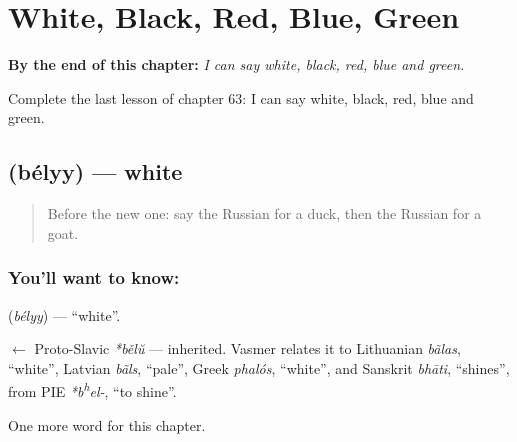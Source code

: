 
\chapter{White, Black, Red, Blue, Green}
\label{ch:ru-white-black-red-blue-green}

\begin{chapteropening}
\textbf{By the end of this chapter:} \emph{I can say white, black, red, blue and green.}

Complete the last lesson of chapter 63: I can say white, black, red, blue and green.
\end{chapteropening}

\section[\texorpdfstring{\ru{белый} (bélyy)}{белый (bélyy)}]{ (bélyy) — white}

\label{lesson:RU-C63-white}



\begin{quote}
Before the new one: say the Russian for a duck, then the Russian for a goat.
\end{quote}

\subsection*{You'll want to know: }
\textbf{} (\emph{bélyy}) — \textquotedblleft{}white\textquotedblright{}.

\begin{cousinweb}
\textbf{} $\leftarrow$ Proto-Slavic \emph{*bělŭ} — inherited. Vasmer relates it to Lithuanian \emph{bãlas}, \textquotedblleft{}white\textquotedblright{}, Latvian \emph{bãls}, \textquotedblleft{}pale\textquotedblright{}, Greek \emph{phalós}, \textquotedblleft{}white\textquotedblright{}, and Sanskrit \emph{bhāti}, \textquotedblleft{}shines\textquotedblright{}, from PIE \emph{*b\textsuperscript{h}el-}, \textquotedblleft{}to shine\textquotedblright{}.
\end{cousinweb}

\begin{grammarlens}[title={What you've built}]
One more word for this chapter.
\end{grammarlens}

